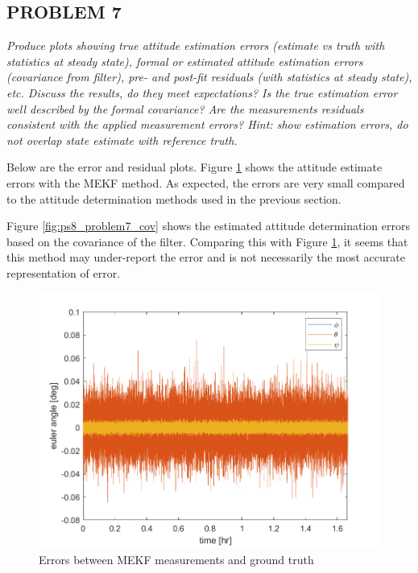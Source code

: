 \subsection{PROBLEM 7}
\textit{Produce plots showing true attitude estimation errors (estimate vs truth with statistics at steady state), formal or estimated attitude estimation errors (covariance from filter), pre- and post-fit residuals (with statistics at steady state), etc. Discuss the results, do they meet expectations? Is the true estimation error well described by the formal covariance? Are the measurements residuals consistent with the applied measurement errors? Hint: show estimation errors, do not overlap state estimate with reference truth.}

Below are the error and residual plots. Figure \ref{fig:ps8_problem7_error} shows the attitude estimate errors with the MEKF method. As expected, the errors are very small compared to the attitude determination methods used in the previous section.

Figure \ref{fig:ps8_problem7_cov} shows the estimated attitude determination errors based on the covariance of the filter. Comparing this with Figure \ref{fig:ps8_problem7_error}, it seems that this method may under-report the error and is not necessarily the most accurate representation of error.

\begin{figure}[H]
\centering
\includegraphics[scale=0.8]{Images/ps8_problem7_error.png}
\caption{Errors between MEKF measurements and ground truth}
\label{fig:ps8_problem7_error}
\end{figure}

